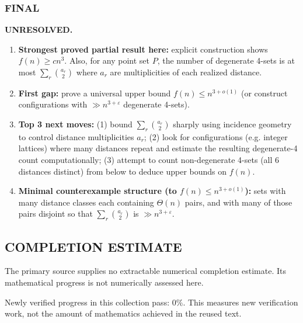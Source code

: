 \subsubsection*{FINAL}
\textbf{UNRESOLVED.}
\begin{enumerate}
\item[(i)] \textbf{Strongest proved partial result here:} explicit construction shows \(f(n)\ge c n^3\). Also, for any point set \(P\), the number of degenerate 4-sets is at most \(\sum_r \binom{a_r}{2}\) where \(a_r\) are multiplicities of each realized distance.
\item[(ii)] \textbf{First gap:} prove a universal upper bound \(f(n)\le n^{3+o(1)}\) (or construct configurations with \(\gg n^{3+\varepsilon}\) degenerate 4-sets).
\item[(iii)] \textbf{Top 3 next moves:}
(1) bound \(\sum_r \binom{a_r}{2}\) sharply using incidence geometry to control distance multiplicities \(a_r\);
(2) look for configurations (e.g. integer lattices) where many distances repeat and estimate the resulting degenerate-4 count computationally;
(3) attempt to count non-degenerate 4-sets (all 6 distances distinct) from below to deduce upper bounds on \(f(n)\).
\item[(iv)] \textbf{Minimal counterexample structure (to \(f(n)\le n^{3+o(1)}\)):}
sets with many distance classes each containing \(\Theta(n)\) pairs, and with many of those pairs disjoint so that \(\sum_r \binom{a_r}{2}\) is \(\gg n^{3+\varepsilon}\).
\end{enumerate}



\subsection*{COMPLETION ESTIMATE}
The primary source supplies no extractable numerical completion estimate. Its mathematical progress is not numerically assessed here.

Newly verified progress in this collection pass: $0\%$. This measures new verification work, not the amount of mathematics achieved in the reused text.
